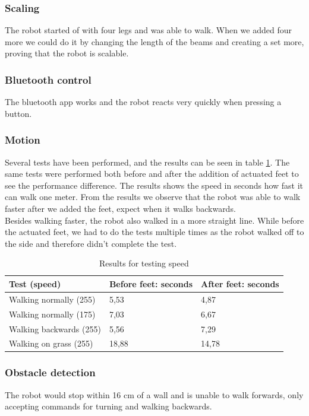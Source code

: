 \subsubsection{Scaling}
The robot started of with four legs and was able to walk. When we added four more we could do it by changing the length of the beams and creating a set more, proving that the robot is scalable.
\\
\subsubsection{Bluetooth control}
The bluetooth app works and the robot reacts very quickly when pressing a button.
\\
\subsubsection{Motion}
Several tests have been performed, and the results can be seen in table \ref{tab:speed_test}. The same tests were performed both before and after the addition of actuated feet to see the performance difference. The results shows the speed in seconds how fast it can walk one meter. From the results we observe that the robot was able to walk faster after we added the feet, expect when it walks backwards. \\
Besides walking faster, the robot also walked in a more straight line. While before the actuated feet, we had to do the  tests multiple times as the robot walked off to the side and therefore didn't complete the test. 
\\
\begin{table}[!ht]
    \centering
    \begin{tabular}{|l|l|l|}
    \hline
        Test (speed) & Before feet: seconds & After feet: seconds \\ \hline
        Walking normally (255) & 5,53 & 4,87 \\ \hline
        Walking normally (175) & 7,03 & 6,67 \\ \hline
        Walking backwards (255) & 5,56 & 7,29 \\ \hline
        Walking on grass (255) & 18,88 & 14,78 \\ \hline
    \end{tabular}
    \caption{Results for testing speed}
    \label{tab:speed_test}
\end{table}
\subsubsection{Obstacle detection}
The robot would stop within 16 cm of a wall and is unable to walk forwards, only accepting commands for turning and walking backwards. 

